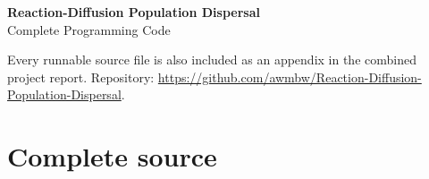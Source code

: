 \documentclass[11pt,a4paper]{article}
\begin{document}
\begin{center}
{\Large\bfseries Reaction-Diffusion Population Dispersal}\\[0.2cm]
{\large Complete Programming Code}
\end{center}

Every runnable source file is also included as an appendix in the combined project report.
Repository: \url{https://github.com/awmbw/Reaction-Diffusion-Population-Dispersal}.
\section{Complete source}

\end{document}
